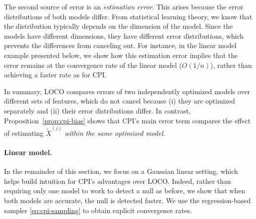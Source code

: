 \documentclass{article}
\theoremstyle{plain}
\theoremstyle{definition}
\theoremstyle{remark}
\begin{document}
The second source of error is an \emph{estimation error}. This arises because the error distributions of both models differ. From statistical learning theory, we know that the distribution typically depends on the dimension of the model. Since the models have different dimensions, they have different error distributions, which prevents the differences from canceling out. For instance, in the linear model example presented below, we show how this estimation error implies that the error remains at the convergence rate of the linear model ($O(1/n)$), rather than achieving a faster rate as for CPI. 


In summary, LOCO compares errors of two independently optimized models over different sets of features, which do not cancel because (i) they are optimized separately and (ii) their error distributions differ. In contrast, Proposition~\ref{prop:cpi-bias} shows that CPI's main error term compares the effect of estimating $\widetilde{X}^{(j)}$ \emph{within the same optimized model}.







\paragraph{Linear model.} 
In the remainder of this section, we focus on a Gaussian linear setting, which helps build intuition for CPI's advantages over LOCO. Indeed, rather than requiring only one model to work to detect a null as before, we show that when both models are accurate, the null is detected faster.
We use the regression-based sampler \eqref{eq:cpi-sampling} to obtain explicit convergence rates.
\end{document}
